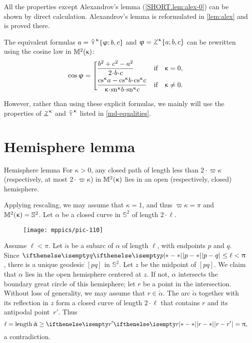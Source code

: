 All the properties except Alexandrov's lemma (\ref{SHORT.lem:alex-0}) can be shown by direct calculation. Alexandrov's lemma is reformulated in \ref{lem:alex} and is proved there.

The equivalent formulas $a
=
\mathop{\tilde\curlyvee}\nolimits^{\upkappa}\{\upvarphi;b,c\}$ and
$\phi
=
\tangle\mc\kappa\{a;b,c\}$
can be rewritten using the cosine law in $\mathbb{M}_{{}}^{2}({\upkappa})$:
\[\cos\phi
=\left[\begin{aligned}
&\frac{b^2+c^2-a^2}{2\cdot b\cdot c}
&\text{if}&\quad \kappa=0,
\\
&\frac{\cs\kappa a-\cs\kappa b\cdot\cs\kappa c}{\kappa\cdot\sn\kappa b\cdot\sn\kappa c}
&\text{if}&\quad \kappa\not=0.
\end{aligned}\right.\]

However, rather than using these explicit formulas,  we mainly will use
the properties of $\tangle\mc\kappa$ and $\mathop{\tilde\curlyvee}\nolimits^{\upkappa}$ listed in \ref{md-equalities}.

\section{Hemisphere lemma}\label{curves-in-model}

\begin{thm}{Hemisphere lemma}
\label{lem:hemisphere}
For $\kappa>0$, any closed path of length less than $2\cdot \varpi\kappa$ (respectively, at most $2\cdot \varpi\kappa$) in $\mathbb{M}_{{}}^{2}({\upkappa})$ lies in an open (respectively, closed) hemisphere. 
\end{thm}

Applying rescaling, we may assume that $\kappa=1$, and thus $\varpi\kappa=\pi$ and $\mathbb{M}_{{}}^{2}({\upkappa})=\mathbb{S}^2$.
Let $\alpha$ be a closed curve in $\mathbb{S}^2$ of length $2\cdot\ell$.



\begin{wrapfigure}{o}{35 mm}
\vskip-0mm
\centering
\texttt{[image: mppics/pic-110]}
\end{wrapfigure}

Assume $\ell<\pi$.
Let $\check\alpha$ be a subarc of $\alpha$ of length $\ell$, with endpoints $p$ and $q$. 
Since $\dist{p}{q}{}\le\ell<\pi$, there is a unique geodesic $[pq]$ in $\mathbb{S}^2$.  
Let $z$ be the midpoint of  $[pq]$.  
We claim that $\alpha$ lies in the open hemisphere centered at $z$.  
If not, $\alpha$ intersects the boundary  great circle of this hemisphere; let $r$ be a point in the intersection.
Without loss of generality, we may assume that $r\in\check\alpha$. 
The arc $\check\alpha$ together with its reflection in $z$ form a closed curve of length $2\cdot \ell$ that contains $r$ and its antipodal point~$r'$.
Thus 
\[\ell=\length \check\alpha\ge \dist{r}{r'}{}=\pi,\] 
a contradiction.

